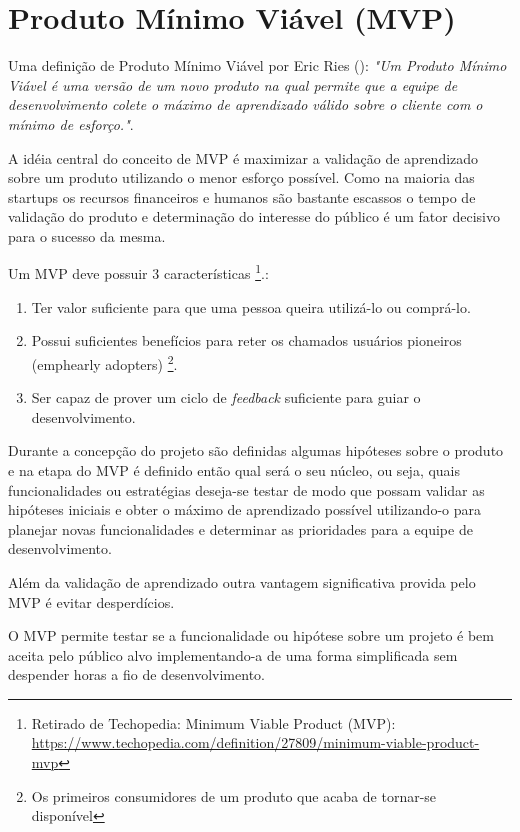 \section{Produto Mínimo Viável (MVP)}

\par Uma definição de Produto Mínimo Viável por Eric Ries (\cite{ries:11}):
\emph{"Um Produto Mínimo Viável é uma versão de um novo produto na qual permite que a equipe de desenvolvimento colete o máximo de aprendizado válido sobre o cliente com o mínimo de esforço."}.
    \par A idéia central do conceito de MVP é maximizar a validação de aprendizado sobre um produto utilizando o menor esforço possível. Como na maioria das startups os recursos financeiros e humanos são bastante escassos o tempo de validação do produto e determinação do interesse do público é um fator decisivo para o sucesso da mesma.
    \par Um MVP deve possuir 3 características \footnote{ Retirado de Techopedia: Minimum Viable Product (MVP): \url{https://www.techopedia.com/definition/27809/minimum-viable-product-mvp}}.:
    \begin{enumerate}
        \item Ter valor suficiente para que uma pessoa queira utilizá-lo ou comprá-lo.
        \item Possui suficientes benefícios para reter os chamados usuários pioneiros (emph{early adopters}) \footnote{Os primeiros consumidores de um produto que acaba de tornar-se disponível}.
        \item Ser capaz de prover um ciclo de \emph{feedback} suficiente para guiar o desenvolvimento.
\end{enumerate}
    \par Durante a concepção do projeto são definidas algumas hipóteses sobre o produto e na etapa do MVP é definido então qual será o seu núcleo, ou seja, quais funcionalidades ou estratégias deseja-se testar de modo que possam validar as hipóteses iniciais e obter o máximo de aprendizado possível utilizando-o para planejar novas funcionalidades e determinar as prioridades para a equipe de desenvolvimento.
    \par Além da validação de aprendizado outra vantagem significativa provida pelo MVP é evitar desperdícios.
    \par O MVP permite testar se a funcionalidade ou hipótese sobre um projeto é bem aceita pelo público alvo implementando-a de uma forma simplificada sem despender horas a fio de desenvolvimento.
